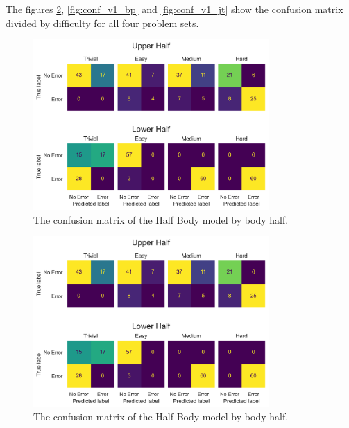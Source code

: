 

The figures \ref{fig:conf_v1_hb}, \ref{fig:conf_v1_bp} and \ref{fig:conf_v1_jt} show the confusion matrix divided by difficulty for all four problem sets.

\begin{figure}[htbp]
  \centering
  \includegraphics[width=0.8\textwidth]{figures/Results/v1/confusion/body_halves_difficulty.png}
  \caption[Full Body Confusion Matrix by Body Half and Difficulty]{The confusion matrix of the Half Body model by body half.}
  \label{fig:conf_v1_fb}
\end{figure}

\begin{figure}[htbp]
  \centering
  \includegraphics[width=0.8\textwidth]{figures/Results/v1/confusion/body_halves_difficulty.png}
  \caption[Half Body Confusion Matrix by Body Half and Difficulty]{The confusion matrix of the Half Body model by body half.}
  \label{fig:conf_v1_hb}
\end{figure}

